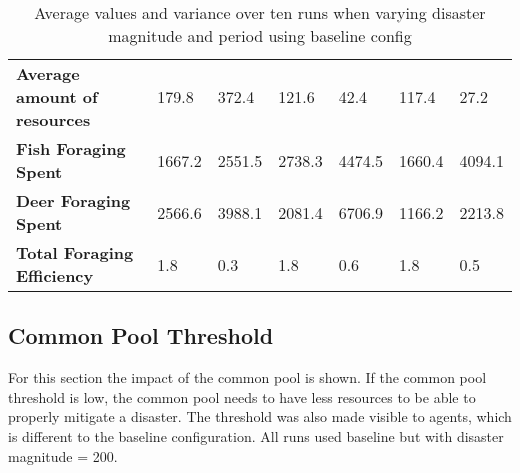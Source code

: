 \begin{table}[h]
\begin{tabular}{l|ll|ll|ll}
\textbf{Average amount of resources} & 179.8                             & 372.4                                & 121.6                             & 42.4                                 & 117.4                             & 27.2                                  \\
\textbf{Fish Foraging Spent}         & 1667.2                            & 2551.5                               & 2738.3                            & 4474.5                               & 1660.4                            & 4094.1                                \\
\textbf{Deer Foraging Spent}         & 2566.6                            & 3988.1                               & 2081.4                            & 6706.9                               & 1166.2                            & 2213.8                                \\
\textbf{Total Foraging Efficiency}    & 1.8                               & 0.3                                  & 1.8                               & 0.6                                  & 1.8                               & 0.5                                  
\end{tabular}
\caption{Average values and variance over ten runs when varying disaster magnitude and period using baseline config}
\label{tab:16_results_and_eval:Disasters:magnitude_period}
\end{table}
\subsection{Common Pool Threshold}
For this section the impact of the common pool is shown. If the common pool threshold is low, the common pool needs to have less resources to be able to properly mitigate a disaster. The threshold was also made visible to agents, which is different to the baseline configuration. All runs used baseline but with disaster magnitude = 200.

